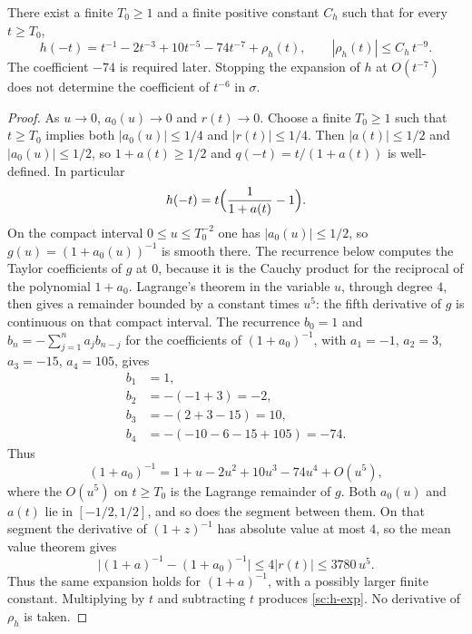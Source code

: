 \begin{lemma}\label{sc:lemma3.2}
There exist a finite \(T_0\ge 1\) and a finite positive constant \(C_h\) such that for every \(t\ge T_0\),
\begin{equation}
\label{sc:h-exp}
h(-t)=t^{-1}-2t^{-3}+10t^{-5}-74t^{-7}+\rho_h(t),
\qquad |\rho_h(t)|\le C_h\,t^{-9}.
\end{equation}
The coefficient \(-74\) is required later. Stopping the expansion of \(h\) at \(O(t^{-7})\) does not determine the coefficient of \(t^{-6}\) in \(\sigma\).

\end{lemma}
\begin{proof}
As \(u\to 0\), \(a_0(u)\to 0\) and \(r(t)\to 0\). Choose a finite \(T_0\ge 1\) such that \(t\ge T_0\) implies both \(|a_0(u)|\le 1/4\) and \(|r(t)|\le 1/4\). Then \(|a(t)|\le 1/2\) and \(|a_0(u)|\le 1/2\), so \(1+a(t)\ge 1/2\) and \(q(-t)=t/(1+a(t))\) is well-defined. In particular
\[
h(-t)=t\Bigl(\frac{1}{1+a(t)}-1\Bigr).
\]
On the compact interval \(0\le u\le T_0^{-2}\) one has \(|a_0(u)|\le 1/2\), so \(g(u)=(1+a_0(u))^{-1}\) is smooth there. The recurrence below computes the Taylor coefficients of \(g\) at \(0\), because it is the Cauchy product for the reciprocal of the polynomial \(1+a_0\). Lagrange's theorem in the variable \(u\), through degree \(4\), then gives a remainder bounded by a constant times \(u^5\): the fifth derivative of \(g\) is continuous on that compact interval. The recurrence \(b_0=1\) and \(b_n=-\sum_{j=1}^n a_j b_{n-j}\) for the coefficients of \((1+a_0)^{-1}\), with \(a_1=-1\), \(a_2=3\), \(a_3=-15\), \(a_4=105\), gives
\begin{align*}
b_1&=1,\\
b_2&=-(-1+3)=-2,\\
b_3&=-(2+3-15)=10,\\
b_4&=-(-10-6-15+105)=-74.
\end{align*}
Thus
\[
(1+a_0)^{-1}=1+u-2u^2+10u^3-74u^4+O(u^5),
\]
where the \(O(u^5)\) on \(t\ge T_0\) is the Lagrange remainder of \(g\). Both \(a_0(u)\) and \(a(t)\) lie in \([-1/2,1/2]\), and so does the segment between them. On that segment the derivative of \((1+z)^{-1}\) has absolute value at most \(4\), so the mean value theorem gives
\[
\bigl|(1+a)^{-1}-(1+a_0)^{-1}\bigr|\le 4|r(t)|\le 3780\,u^5.
\]
Thus the same expansion holds for \((1+a)^{-1}\), with a possibly larger finite constant. Multiplying by \(t\) and subtracting \(t\) produces \eqref{sc:h-exp}. No derivative of \(\rho_h\) is taken.

\end{proof}

